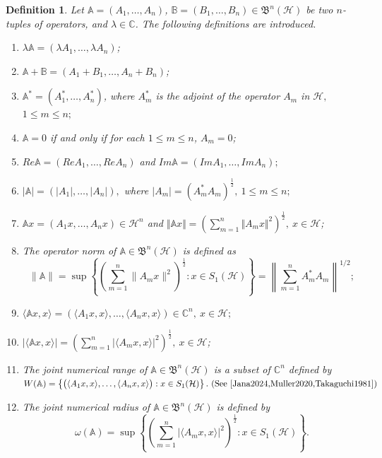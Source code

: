 \documentclass[12pt]{article}
\newtheorem{definition}{Definition}
\begin{document}
\begin{definition}
\label{def1}
Let $\mathbb{A} = (A_{1}, \ldots, A_{n})$, $\mathbb{B} = (B_{1}, \ldots, B_{n}) \in \mathfrak{B}^{n}(\mathcal{H})$ be two $n$-tuples of operators, and $\lambda \in \mathbb{C}$. The following definitions are introduced.
\begin{enumerate}[label=\upshape{\arabic*.}, ref=\upshape{\arabic*}, labelindent=5pt, leftmargin=*]
    \item $\lambda \mathbb{A} = (\lambda A_{1}, \ldots, \lambda A_{n})$;
    \item $\mathbb{A} + \mathbb{B} = (A_{1} + B_{1}, \ldots, A_{n} + B_{n})$;
    \item $\mathbb{A}^{*} = (A_{1}^{*}, \ldots, A_{n}^{*})$, where $ A_{m}^{*} $ is the adjoint of the operator $ A_{m} $ in $ \mathcal{H}, $ $ 1\leq m \leq n; $
    \item $\mathbb{A} = 0$ if and only if for each $1 \le m \le n$, $A_{m} = 0$;
    \item $Re \mathbb{A} = (Re A_{1}, \ldots, Re A_{n})$
    and $Im \mathbb{A} = (Im A_{1}, \ldots, Im A_{n}) ;$
    \item $ \vert \mathbb{A} \vert = \left( \vert A_{1} \vert , \ldots , \vert A_{n} \vert \right),   $ where $ \vert A_{m} \vert = (A_{m}^{*}A_{m})^{\frac{1}{2}} , \  1\leq m \leq n; $
    \item $\mathbb{A} x =(A_{1}x,\ldots,A_{n}x)\in \mathcal{H}^{n}$ and     $\Vert\mathbb{A} x\Vert =
    \left( \sum\limits_{m=1}^{n} \Vert A_{m}x\Vert^{2} \right)^{\frac{1}{2}}, \ x \in \mathcal{H}$;
    \item The operator norm of $\mathbb{A} \in \mathfrak{B}^{n}(\mathcal{H})$ is defined as
    \[
        \|\mathbb{A}\| =
        \sup \left\{
            \left( \sum\limits_{m=1}^{n} \|A_{m}x\|^{2} \right)^{\frac{1}{2}}
            : x \in S_{1}(\mathcal{H})
        \right\} =\left\| \sum\limits_{m=1}^n A_m^* A_m \right\|^{1/2} ;
    \]
    \item $ \langle \mathbb{A}x,x \rangle = \left( \langle A_{1}x,x\rangle, \ldots , \langle A_{n}x,x\rangle \right) \in \mathbb{C}^{n} , \   x\in \mathcal{H}; $
    \item $|\langle \mathbb{A} x,x\rangle| =
    \left( \sum\limits_{m=1}^{n} |\langle A_{m}x, x\rangle|^{2} \right)^{\frac{1}{2}}, \ x \in \mathcal{H}$;
    \item The joint numerical range of $\mathbb{A} \in \mathfrak{B}^{n}(\mathcal{H})$ is a subset of $\mathbb{C}^{n}$ defined by
    $
        W(\mathbb{A}) =
        \left\{
            \bigl(\langle A_{1}x, x\rangle, \ldots, \langle A_{n}x, x\rangle\bigr)
            : x \in S_{1}(\mathcal{H})
        \right\}.\ \textnormal{(See  \textnormal{\cite{Jana2024,Muller2020,Takaguchi1981}})}
   $
    \item The joint numerical radius of $\mathbb{A} \in \mathfrak{B}^{n}(\mathcal{H})$ is defined by
    \[
        \omega(\mathbb{A}) =
        \sup \left\{
            \left( \sum\limits_{m=1}^{n} |\langle A_{m}x, x\rangle|^{2} \right)^{\frac{1}{2}}
            : x \in S_{1}(\mathcal{H})
        \right\}.
    \]
\end{enumerate}
\end{definition}
\end{document}
